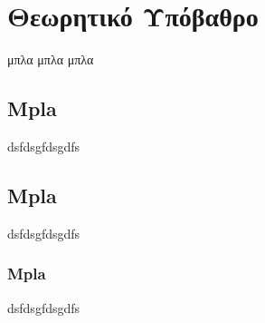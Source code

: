\chapter{Θεωρητικό Υπόβαθρο}
μπλα μπλα μπλα

\section{Mpla}
dsfdsgfdsgdfs

\section{Mpla}
dsfdsgfdsgdfs
\subsection{Mpla}
dsfdsgfdsgdfs

